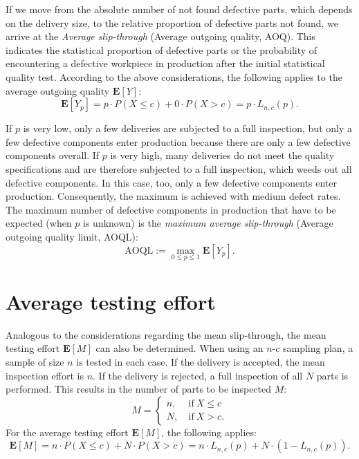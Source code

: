 \documentclass[a4paper,11pt,oneside]{article}
\begin{document}
If we move from the absolute number of not found defective parts, which depends on the delivery size, to the relative proportion of defective parts not found, we arrive at the \emph {Average slip-through} (Average outgoing quality, AOQ). This indicates the statistical proportion of defective parts or the probability of encountering a defective workpiece in production after the initial statistical quality test. According to the above considerations, the following applies to the average outgoing quality $\mathbf{E}[Y]$:
$$
\mathbf{E}[Y_p]=
p\cdot P(X\le c) + 0\cdot P(X>c)=
p\cdot L_{n,c}(p).
$$

If $p$ is very low, only a few deliveries are subjected to a full inspection, but only a few defective components enter production because there are only a few defective components overall. If $p$ is very high, many deliveries do not meet the quality specifications and are therefore subjected to a full inspection, which weeds out all defective components. In this case, too, only a few defective components enter production. Consequently, the maximum is achieved with medium defect rates. The maximum number of defective components in production that have to be expected (when $p$ is unknown) is the \emph{maximum average slip-through} (Average outgoing quality limit, AOQL):
$$
\mathrm{AOQL}:=
\max_{0\le p\le1} \mathbf{E}[Y_p].
$$



\section{Average testing effort}

Analogous to the considerations regarding the mean slip-through, the mean testing effort $\mathbf{E}[M]$ can also be determined. When using an $n$-$c$ sampling plan, a sample of size $n$ is tested in each case. If the delivery is accepted, the mean inspection effort is $n$. If the delivery is rejected, a full inspection of all $N$ parts is performed. This results in the number of parts to be inspected $M$:
$$
M=
\begin{cases}
n, & ~\text{if}~ X\le c\\
N, & ~\text{if}~ X>c.
\end{cases}
$$
For the average testing effort $\mathbf{E}[M]$, the following applies:
$$
\mathbf{E}[M]=
n\cdot P(X\le c) + N\cdot P(X>c)=
n\cdot L_{n,c}(p) + N\cdot(1-L_{n,c}(p)).
$$
\end{document}
